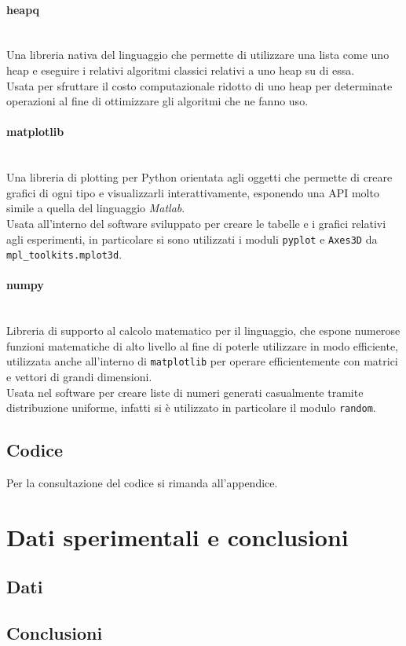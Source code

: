 \paragraph{heapq}\mbox{}\\
Una libreria nativa del linguaggio che permette di utilizzare una lista come uno heap e eseguire i relativi algoritmi classici relativi a uno heap su di essa.\\
Usata per sfruttare il costo computazionale ridotto di uno heap per determinate operazioni al fine di ottimizzare gli algoritmi che ne fanno uso.

\paragraph{matplotlib}\mbox{}\\
Una libreria di plotting per Python orientata agli oggetti che permette di creare grafici di ogni tipo e visualizzarli interattivamente, esponendo una API molto simile a quella del 
linguaggio \textit{Matlab}.\\
Usata all'interno del software sviluppato per creare le tabelle e i grafici relativi agli esperimenti, in particolare si sono utilizzati i moduli \texttt{pyplot} 
e \texttt{Axes3D} da \texttt{mpl\_toolkits.mplot3d}.

\paragraph{numpy}\mbox{}\\
Libreria di supporto al calcolo matematico per il linguaggio, che espone numerose funzioni matematiche di alto livello al fine di poterle utilizzare in modo
efficiente, utilizzata anche all'interno di \texttt{matplotlib} per operare efficientemente con matrici e vettori di grandi dimensioni.\\
Usata nel software per creare liste di numeri generati casualmente tramite distribuzione uniforme, infatti si è utilizzato in particolare il modulo
\texttt{random}.


\subsection{Codice}
Per la consultazione del codice si rimanda all'appendice.
% 


\section{Dati sperimentali e conclusioni}

\subsection{Dati}


\subsection{Conclusioni}